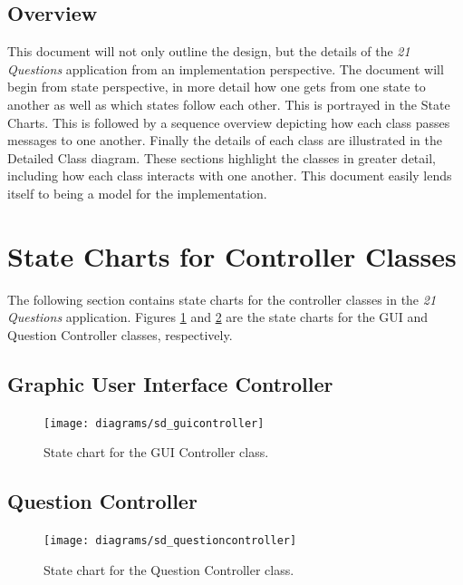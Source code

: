 \documentclass[titlepage]{article}
\begin{document}

\subsection{Overview}
\label{sub:overview}


This document will not only outline the design, but the details of the \textit{21 Questions} application from an implementation perspective. The document will begin from state perspective, in more detail how one gets from one state to another as well as which states follow each other. This is portrayed in the State Charts. This is followed by a sequence overview depicting how each class passes messages to one another. Finally the details of each class are 
illustrated in the Detailed Class diagram. These sections highlight the classes in greater detail, including how each class interacts with one another. This document easily lends itself to being a model for the implementation.



\section{State Charts for Controller Classes}
\label{sec:state_charts_for_controller_classes}
The following section contains state charts for the controller classes in the \textit{21 Questions} application. Figures \ref{sc:gui} and \ref{sc:question} are the state charts for the GUI and Question Controller classes, respectively.

\subsection{Graphic User Interface Controller}
\begin{figure}[H]
\texttt{[image: diagrams/sd\_guicontroller]}
\caption{State chart for the GUI Controller class.}\label{sc:gui}
\end{figure}

\subsection{Question Controller}
\begin{figure}[H]
\texttt{[image: diagrams/sd\_questioncontroller]}
\caption{State chart for the Question Controller class.}\label{sc:question}
\end{figure}
\end{document}
